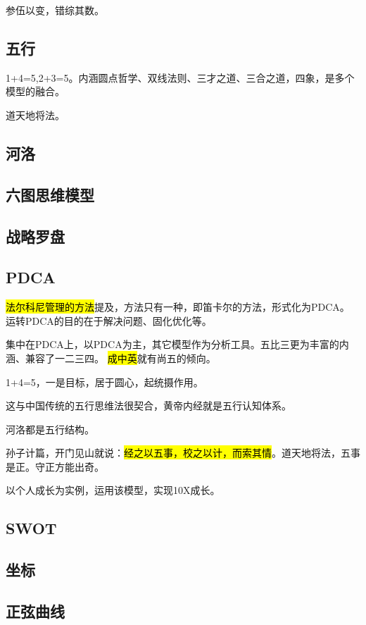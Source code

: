参伍以变，错综其数。

\subsection{五行}

1+4=5,2+3=5。内涵圆点哲学、双线法则、三才之道、三合之道，四象，是多个模型的融合。

道天地将法。

\subsection{河洛}

\subsection{六图思维模型}

\subsection{战略罗盘}

\subsection{PDCA}

\hl{法尔科尼管理的方法}提及，方法只有一种，即笛卡尔的方法，形式化为PDCA。
运转PDCA的目的在于解决问题、固化优化等。

集中在PDCA上，以PDCA为主，其它模型作为分析工具。五比三更为丰富的内涵、兼容了一二三四。
\hl{成中英}就有尚五的倾向。

1+4=5，一是目标，居于圆心，起统摄作用。

这与中国传统的五行思维法很契合，黄帝内经就是五行认知体系。

河洛都是五行结构。

孙子计篇，开门见山就说：\hl{经之以五事，校之以计，而索其情}。道天地将法，五事是正。守正方能出奇。

以个人成长为实例，运用该模型，实现10X成长。

\subsection{SWOT}

\subsection{坐标}

\subsection{正弦曲线}

